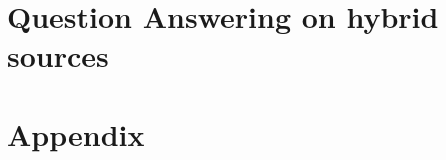 





\part{Question Answering on hybrid sources}
{}








\appendix
\part{Appendix}
%
\cleardoublepage
\cleardoublepage

